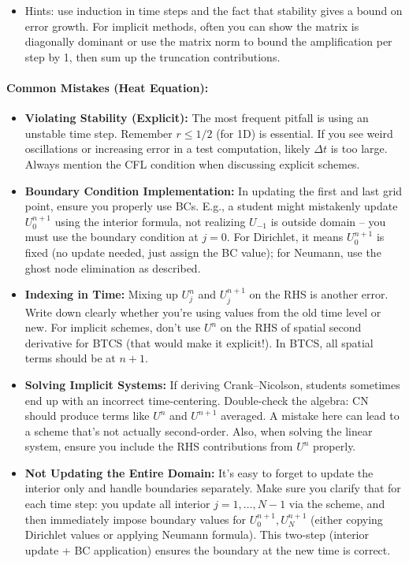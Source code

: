 \documentclass[a4paper,11pt]{report}
\begin{document}
\begin{enumerate}
\begin{itemize}
              \item Hints: use induction in time steps and the fact that stability gives a bound on error growth. For implicit methods, often you can show the matrix is diagonally dominant or use the matrix norm to bound the amplification per step by 1, then sum up the truncation contributions.
          \end{itemize}
\end{enumerate}

\paragraph{Common Mistakes (Heat Equation):}
\begin{itemize}
    \item \textbf{Violating Stability (Explicit):} The most frequent pitfall is using an unstable time step. Remember $r \le 1/2$ (for 1D) is essential. If you see weird oscillations or increasing error in a test computation, likely $\Delta t$ is too large. Always mention the CFL condition when discussing explicit schemes.

    \item \textbf{Boundary Condition Implementation:} In updating the first and last grid point, ensure you properly use BCs. E.g., a student might mistakenly update $U_0^{n+1}$ using the interior formula, not realizing $U_{-1}$ is outside domain -- you must use the boundary condition at $j=0$. For Dirichlet, it means $U_0^{n+1}$ is fixed (no update needed, just assign the BC value); for Neumann, use the ghost node elimination as described.

    \item \textbf{Indexing in Time:} Mixing up $U_j^{n}$ and $U_j^{n+1}$ on the RHS is another error. Write down clearly whether you're using values from the old time level or new. For implicit schemes, don't use $U^n$ on the RHS of spatial second derivative for BTCS (that would make it explicit!). In BTCS, all spatial terms should be at $n+1$.

    \item \textbf{Solving Implicit Systems:} If deriving Crank--Nicolson, students sometimes end up with an incorrect time-centering. Double-check the algebra: CN should produce terms like $U^n$ and $U^{n+1}$ averaged. A mistake here can lead to a scheme that's not actually second-order. Also, when solving the linear system, ensure you include the RHS contributions from $U^n$ properly.

    \item \textbf{Not Updating the Entire Domain:} It's easy to forget to update the interior only and handle boundaries separately. Make sure you clarify that for each time step: you update all interior $j=1,\ldots,N-1$ via the scheme, and then immediately impose boundary values for $U_0^{n+1},U_N^{n+1}$ (either copying Dirichlet values or applying Neumann formula). This two-step (interior update + BC application) ensures the boundary at the new time is correct.
\end{itemize}
\end{document}
